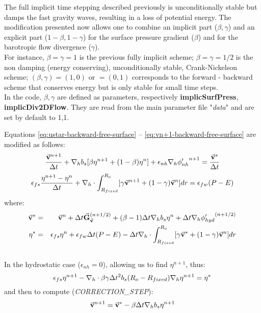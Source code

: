 The full implicit time stepping described previously is
unconditionally stable but damps the fast gravity waves, resulting in
a loss of potential energy.  The modification presented now allows one
to combine an implicit part ($\beta,\gamma$) and an explicit part
($1-\beta,1-\gamma$) for the surface pressure gradient ($\beta$) and
for the barotropic flow divergence ($\gamma$).
\\
For instance, $\beta=\gamma=1$ is the previous fully implicit scheme;
$\beta=\gamma=1/2$ is the non damping (energy conserving), unconditionally
stable, Crank-Nickelson scheme; $(\beta,\gamma)=(1,0)$ or $=(0,1)$
corresponds to the forward - backward scheme that conserves energy but is
only stable for small time steps.\\
In the code, $\beta,\gamma$ are defined as parameters, respectively 
{\bf implicSurfPress}, {\bf implicDiv2DFlow}. They are read from
the main parameter file "{\em data}" and are set by default to 1,1.

Equations \ref{eq:ustar-backward-free-surface} --
\ref{eq:vn+1-backward-free-surface} are modified as follows:
\begin{eqnarray*}
\frac{ \vec{\bf v}^{n+1} }{ \Delta t }
+ {\bf \nabla}_h b_s [ \beta {\eta}^{n+1} + (1-\beta) {\eta}^{n} ] 
+ \epsilon_{nh} {\bf \nabla}_h {\phi'_{nh}}^{n+1}
 = \frac{ \vec{\bf v}^* }{ \Delta t }
\end{eqnarray*}
\begin{eqnarray}
\epsilon_{fs} \frac{ {\eta}^{n+1} - {\eta}^{n} }{ \Delta t}
+ {\bf \nabla}_h \cdot \int_{R_{fixed}}^{R_o} 
[ \gamma \vec{\bf v}^{n+1} + (1-\gamma) \vec{\bf v}^{n}] dr
= \epsilon_{fw} (P-E)
\label{eq:eta-n+1-CrankNick}
\end{eqnarray}
where:
\begin{eqnarray*}
\vec{\bf v}^* & = &
\vec{\bf v} ^{n} + \Delta t \vec{\bf G}_{\vec{\bf v}} ^{(n+1/2)}
+ (\beta-1) \Delta t {\bf \nabla}_h b_s {\eta}^{n}
+ \Delta t {\bf \nabla}_h {\phi'_{hyd}}^{(n+1/2)}
\\
{\eta}^* & = &
\epsilon_{fs} {\eta}^{n} + \epsilon_{fw} \Delta t (P-E) 
- \Delta t {\bf \nabla}_h \cdot \int_{R_{fixed}}^{R_o} 
[ \gamma \vec{\bf v}^* + (1-\gamma) \vec{\bf v}^{n}] dr
\end{eqnarray*}
\\
In the hydrostatic case ($\epsilon_{nh}=0$), allowing us to find
${\eta}^{n+1}$, thus:
$$
\epsilon_{fs} {\eta}^{n+1} -
{\bf \nabla}_h \cdot \beta\gamma \Delta t^2 b_s (R_o - R_{fixed})
{\bf \nabla}_h {\eta}^{n+1}
= {\eta}^*
$$ 
and then to compute ({\em CORRECTION\_STEP}):
$$
\vec{\bf v}^{n+1} = \vec{\bf v}^{*}
- \beta \Delta t {\bf \nabla}_h b_s {\eta}^{n+1}
$$

